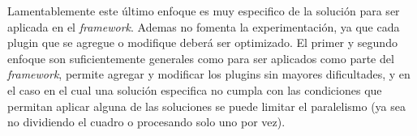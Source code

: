 Lamentablemente este último enfoque es muy especifico de la solución para ser
aplicada en el \emph{framework}. Ademas no fomenta la experimentación, ya que
cada plugin que se agregue o modifique deberá ser optimizado. El primer y
segundo enfoque son suficientemente generales como para ser aplicados como parte
del \emph{framework}, permite agregar y modificar los plugins sin mayores
dificultades, y en el caso en el cual una solución especifica no cumpla con las
condiciones que permitan aplicar alguna de las soluciones se puede limitar el
paralelismo (ya sea no dividiendo el cuadro o procesando solo uno por vez).
